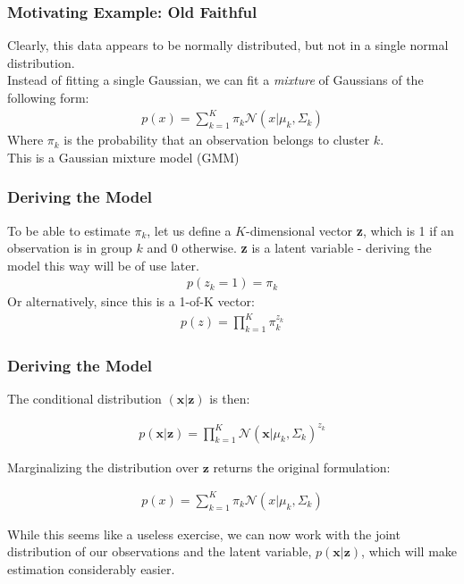 \documentclass{beamer}
\begin{document}
\begin{frame}
\frametitle{Motivating Example: Old Faithful}
Clearly, this data appears to be normally distributed, but not in a single normal distribution.\\
Instead of fitting a single Gaussian, we can fit a \textit{mixture} of Gaussians of the following form:
\begin{align*}
p(x) = \sum_{k=1}^{K} \pi_k \mathcal{N} (x | \mu_k, \Sigma_k)
\end{align*}
Where $\pi_k$ is the probability that an observation belongs to cluster $k$. \\
This is a Gaussian mixture model (GMM)
\end{frame}

\begin{frame}
\frametitle{Deriving the Model}
	To be able to estimate $\pi_k$, let us define a $K$-dimensional vector \textbf{z}, which is 1 if an observation is in group $k$ and 0 otherwise. \textbf{z} is a latent variable - deriving the model this way will be of use later.\\
	\begin{align*}
	p(z_k = 1) = \pi_k
	\end{align*}
	Or alternatively, since this is a 1-of-K vector:
	\begin{align*}
	p(z)  = \prod_{k = 1}^{K} \pi_k^{z_k}
	\end{align*}

\end{frame}

 \begin{frame}
 \frametitle{Deriving the Model}
 
 	The conditional distribution $(\mathbf{x} | \mathbf{z})$ is then:

 	\begin{align*}
 	p(\mathbf{x}|\mathbf{z}) = \prod_{k = 1}^{K} \mathcal{N}(\mathbf{x} | \mu_k, \Sigma_k)^{z_k}
 	\end{align*}
 	
 	Marginalizing the distribution over $\mathbf{z}$ returns the original formulation:
 	
 	\begin{align*}
 	p(x) = \sum_{k=1}^{K} \pi_k \mathcal{N} (x | \mu_k, \Sigma_k)
 	\end{align*}
 	
 	While this seems like a useless exercise, we can now work with the joint distribution of our observations and the latent variable, $p(\mathbf{x}|\mathbf{z})$, which will make estimation considerably easier.
 
 \end{frame}
\end{document}
